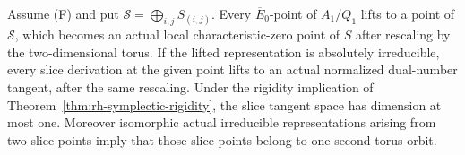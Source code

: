 \begin{lemma}
\label{lem:rh-sp4-slice-points}
Assume (F) and put \(\mathscr S=\bigoplus_{i,j}S_{(i,j)}\).
Every \(\overline E_0\)-point of \(A_1/Q_1\) lifts to a
point of \(\mathscr S\), which becomes an actual local
characteristic-zero point of \(S\) after rescaling by the
two-dimensional torus. If the lifted representation is
absolutely irreducible, every slice derivation at the given
point lifts to an actual normalized dual-number tangent,
after the same rescaling. Under the rigidity implication
of Theorem~\ref{thm:rh-symplectic-rigidity}, the slice
tangent space has dimension at most one.
Moreover isomorphic actual irreducible representations
arising from two slice points imply that those slice
points belong to one second-torus orbit.
\end{lemma}

